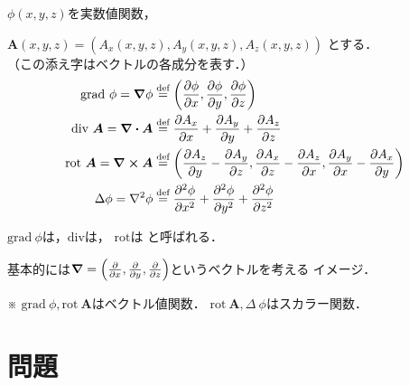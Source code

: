 \documentclass[dvipdfmx,a4j,11pt]{jsarticle}
\begin{document}
\begin{dfn}{}{}
   $\phi(x,y,z)$を実数値関数，

   $\bm{A} (x,y,z)=(A_x(x,y,z),A_y(x,y,z),A_z(x,y,z))$
   とする．\\
   （この添え字はベクトルの各成分を表す．）
   \begin{align}
      \text{grad}\ \phi = \grad \phi &\overset{\text{def}}{=}
      \qty(\pdv{\phi}{x},\pdv{\phi}{y},\pdv{\phi}{z})\\
      \text{div}\ \bm{A} = \div{\bm{A}} &\overset{\text{def}}{=}
      \pdv{A_x}{x}+\pdv{A_y}{y}+\pdv{A_z}{z}\\
      \text{rot}\ \bm{A} = \curl{ \bm{A}} &\overset{\text{def}}{=}
      \qty(\pdv{A_z}{y}-\pdv{A_y}{z},\pdv{A_x}{z}-\pdv{A_z}{x},
      \pdv{A_y}{x}-\pdv{A_x}{y})\\
      \Delta \phi = \laplacian \phi &\overset{\text{def}}{=}  
       \pdv[2]{\phi}{x}+\pdv[2]{\phi}{y}+\pdv[2]{\phi}{z}      
   \end{align}

   $\text{grad}\ \phi$は，$\text{div}$は，
   $\text{rot}$は と呼ばれる．
\end{dfn}

基本的には$\grad =\qty(\pdv{x},\pdv{y},\pdv{z})$というベクトルを考える
イメージ．

※ $\text{grad}\ \phi , \text{rot}\ \bm{A}$はベクトル値関数．
$\text{rot}\ \bm{A}, \Delta \ \phi $はスカラー関数．


\section{問題}
\end{document}
